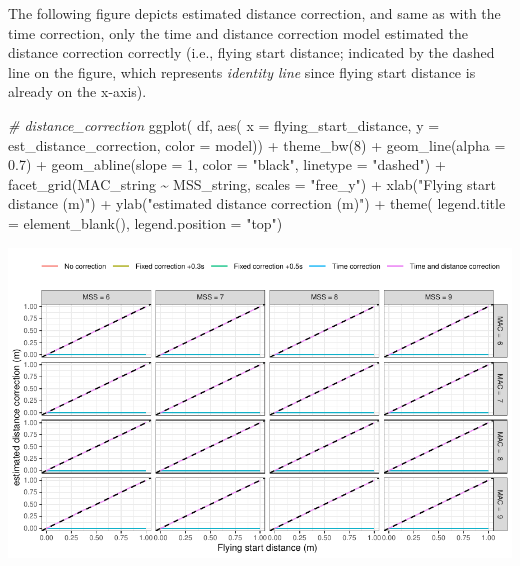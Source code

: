 \documentclass[fleqn,10pt,lineno]{wlpeerj} %
\newenvironment{Shaded}{\begin{snugshade}}{\end{snugshade}}
\newcommand{\AttributeTok}[1]{\textcolor[rgb]{0.77,0.63,0.00}{#1}}
\newcommand{\CommentTok}[1]{\textcolor[rgb]{0.56,0.35,0.01}{\textit{#1}}}
\newcommand{\DecValTok}[1]{\textcolor[rgb]{0.00,0.00,0.81}{#1}}
\newcommand{\FloatTok}[1]{\textcolor[rgb]{0.00,0.00,0.81}{#1}}
\newcommand{\FunctionTok}[1]{\textcolor[rgb]{0.00,0.00,0.00}{#1}}
\newcommand{\NormalTok}[1]{#1}
\newcommand{\SpecialCharTok}[1]{\textcolor[rgb]{0.00,0.00,0.00}{#1}}
\newcommand{\StringTok}[1]{\textcolor[rgb]{0.31,0.60,0.02}{#1}}
\begin{document}
The following figure depicts estimated distance correction, and same as with the time correction, only the time and distance correction model estimated the distance correction correctly (i.e., flying start distance; indicated by the dashed line on the figure, which represents \emph{identity line} since flying start distance is already on the x-axis).

\begin{Shaded}
\begin{Highlighting}[]
\CommentTok{\# distance\_correction}
\FunctionTok{ggplot}\NormalTok{(}
\NormalTok{  df,}
  \FunctionTok{aes}\NormalTok{(}
    \AttributeTok{x =}\NormalTok{ flying\_start\_distance,}
    \AttributeTok{y =}\NormalTok{ est\_distance\_correction, }
    \AttributeTok{color =}\NormalTok{ model)) }\SpecialCharTok{+}
  \FunctionTok{theme\_bw}\NormalTok{(}\DecValTok{8}\NormalTok{) }\SpecialCharTok{+}
  \FunctionTok{geom\_line}\NormalTok{(}\AttributeTok{alpha =} \FloatTok{0.7}\NormalTok{) }\SpecialCharTok{+}
  \FunctionTok{geom\_abline}\NormalTok{(}\AttributeTok{slope =} \DecValTok{1}\NormalTok{, }\AttributeTok{color =} \StringTok{"black"}\NormalTok{, }\AttributeTok{linetype =} \StringTok{"dashed"}\NormalTok{) }\SpecialCharTok{+}
  \FunctionTok{facet\_grid}\NormalTok{(MAC\_string }\SpecialCharTok{\textasciitilde{}}\NormalTok{ MSS\_string, }\AttributeTok{scales =} \StringTok{"free\_y"}\NormalTok{) }\SpecialCharTok{+}
  \FunctionTok{xlab}\NormalTok{(}\StringTok{"Flying start distance (m)"}\NormalTok{) }\SpecialCharTok{+}
  \FunctionTok{ylab}\NormalTok{(}\StringTok{"estimated distance correction (m)"}\NormalTok{) }\SpecialCharTok{+}
  \FunctionTok{theme}\NormalTok{(}
    \AttributeTok{legend.title =} \FunctionTok{element\_blank}\NormalTok{(),}
    \AttributeTok{legend.position =} \StringTok{"top"}\NormalTok{)}
\end{Highlighting}
\end{Shaded}

\begin{center}\includegraphics[width=1\linewidth]{paper_files/figure-latex/unnamed-chunk-46-1} \end{center}
\end{document}
